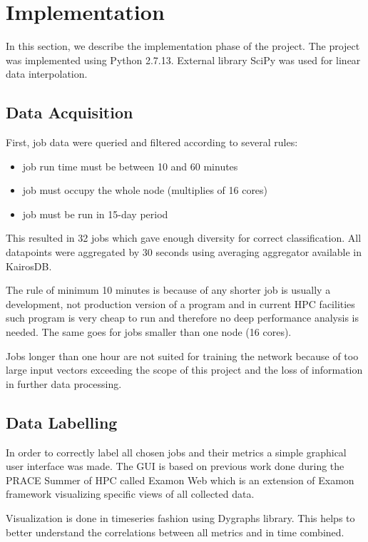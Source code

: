 \section{Implementation}
In this section, we describe the implementation phase of the project. The project was implemented using Python 2.7.13. External library SciPy\cite{scipy} was used for linear data interpolation.

\label{sec:implementation}

\subsection{Data Acquisition}
\label{sec:data-filter}
First, job data were queried and filtered according to several rules:
\begin{itemize}
    \item job run time must be between 10 and 60 minutes
    \item job must occupy the whole node (multiplies of 16 cores)
    \item job must be run in 15-day period
\end{itemize}

This resulted in 32 jobs which gave enough diversity for correct classification. All datapoints were aggregated by 30 seconds using averaging aggregator available in KairosDB.

The rule of minimum 10 minutes is because of any shorter job is usually a development, not production version of a program and in current HPC facilities such program is very cheap to run and therefore no deep performance analysis is needed. The same goes for jobs smaller than one node (16 cores).

Jobs longer than one hour are not suited for training the network because of too large input vectors exceeding the scope of this project and the loss of information in further data processing.

\subsection{Data Labelling}
In order to correctly label all chosen jobs and their metrics a simple graphical user interface was made. The GUI is based on previous work done during the PRACE Summer of HPC called Examon Web which is an extension of Examon framework visualizing specific views of all collected data.

Visualization is done in timeseries fashion using Dygraphs library. This helps to better understand the correlations between all metrics and in time combined.

